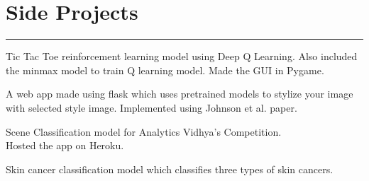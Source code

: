\documentclass[]{puneet-resume}
\begin{document}
\begin{minipage}[t]{0.66\textwidth}
\section{Side Projects}
\noindent\rule{12.5cm}{0.4pt}
 
\noindent
\hspace{5em}%
\begin{minipage}{0.85\textwidth\vspace{2pt}}
Tic Tac Toe reinforcement learning model using Deep Q Learning.
Also included the minmax model to train Q learning model.
Made the GUI in Pygame.
\end{minipage}
 
\noindent
\hspace{5em}%
\begin{minipage}{0.85\textwidth\vspace{2pt}}
A web app made using flask which uses pretrained models to stylize your image
with selected style image. Implemented using Johnson et al. paper.
\end{minipage}
 
\noindent
\hspace{5em}%
\begin{minipage}{0.85\textwidth\vspace{2pt}}
Scene Classification model for Analytics Vidhya's Competition.\\
Hosted the app on Heroku.
\end{minipage}
 
\noindent
\hspace{5em}%
\begin{minipage}{0.85\textwidth\vspace{2pt}}
Skin cancer classification model which classifies three types of skin cancers.
\end{minipage}
\end{minipage} 
\end{document}
